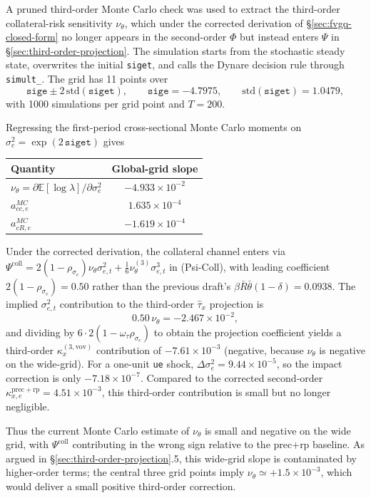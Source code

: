\documentclass[11pt]{article}
\newcommand{\E}{\mathbb{E}}
\newcommand{\kxvov}{\kappa_x^{(3,\mathrm{vov})}}
\newcommand{\nuth}{\nu_\theta}
\newcommand{\nuthIII}{\nu_\theta^{(3)}}
\theoremstyle{plain}
\theoremstyle{definition}
\begin{document}
A pruned third-order Monte Carlo check was used to extract the third-order
collateral-risk sensitivity $\nuth$, which under the corrected derivation of
§\ref{sec:fvgq-closed-form} no longer appears in the second-order $\Phi$ but
instead enters $\Psi$ in §\ref{sec:third-order-projection}. The simulation
starts from the stochastic steady state, overwrites the initial
\texttt{siget}, and calls the Dynare decision rule through \texttt{simult\_}.
The grid has 11 points over
\[
\texttt{sige}\pm2\,\mathrm{std}(\texttt{siget}),
\qquad
\texttt{sige}=-4.7975,
\qquad
\mathrm{std}(\texttt{siget})=1.0479,
\]
with 1000 simulations per grid point and $T=200$.

Regressing the first-period cross-sectional Monte Carlo moments on
$\sigma_e^2=\exp(2\,\texttt{siget})$ gives
\begin{center}
\begin{tabular}{lc}
\toprule
Quantity & Global-grid slope \\
\midrule
$\nu_\theta=\partial \E[\log\lambda]/\partial\sigma_e^2$ &
$-4.933\times10^{-2}$ \\
$a_{cc,e}^{MC}$ & $1.635\times10^{-4}$ \\
$a_{cR,e}^{MC}$ & $-1.619\times10^{-4}$ \\
\bottomrule
\end{tabular}
\end{center}

Under the corrected derivation, the collateral channel enters via
$\Psi^{\mathrm{coll}} = 2(1-\rho_{\sigma_e})\nuth\sigma_{e,t}^2 + \tfrac{1}{6}
\nuthIII\sigma_{e,t}^3$ in (Psi-Coll), with leading coefficient
$2(1-\rho_{\sigma_e}) = 0.50$ rather than the previous draft's
$\beta\bar R\bar\theta(1-\delta) = 0.0938$. The implied $\sigma_{e,t}^2$
contribution to the third-order $\hat\tau_x$ projection is
\[
0.50\,\nu_\theta = -2.467\times10^{-2},
\]
and dividing by $6\cdot 2(1-\omega_\tau\rho_{\sigma_e})$ to obtain the
projection coefficient yields a third-order $\kxvov$ contribution of
$-7.61\times 10^{-3}$ (negative, because $\nu_\theta$ is negative on the
wide-grid). For a one-unit \texttt{ue} shock,
$\Delta\sigma_e^2=9.44\times10^{-5}$, so the impact correction is only
$-7.18\times10^{-7}$. Compared to the corrected second-order
$\kappa_{x,e}^{\mathrm{prec+rp}} = 4.51\times 10^{-3}$, this third-order
contribution is small but no longer negligible.

Thus the current Monte Carlo estimate of $\nu_\theta$ is small and negative
on the wide grid, with $\Psi^{\mathrm{coll}}$ contributing in the wrong sign
relative to the prec+rp baseline. As argued in
§\ref{sec:third-order-projection}.5, this wide-grid slope is contaminated by
higher-order terms; the central three grid points imply $\nu_\theta\simeq
+1.5\times 10^{-3}$, which would deliver a small positive third-order
correction.
\end{document}
